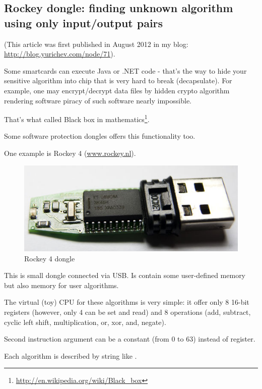 ﻿\subsection{Rockey dongle: finding unknown algorithm using only input/output pairs}

(This article was first published in August 2012 in my blog: \url{http://blog.yurichev.com/node/71}).

Some smartcards can execute Java or .NET code - that's the way to hide your sensitive algorithm into chip that is very hard to break (decapsulate).
For example, one may encrypt/decrypt data files by hidden crypto algorithm rendering software piracy of such software nearly impossible.

That's what called Black box in mathematics\footnote{\url{http://en.wikipedia.org/wiki/Black\_box}}.

Some software protection dongles offers this functionality too.

One example is Rockey 4 (\href{http://www.rockey.nl/en/rockey.html}{www.rockey.nl}).

\begin{figure}[H]
\centering
\includegraphics[scale=2]{SMT/rockey_4.jpg}
\caption{Rockey 4 dongle}
\end{figure}

This is small dongle connected via USB. Is contain some user-defined memory but also memory for user algorithms.

The virtual (toy) CPU for these algorithms is very simple: it offer only 8 16-bit registers (however, only 4 can be set and read) and 8 operations (add, subtract, cyclic left shift, multiplication, or, xor, and, negate).

Second instruction argument can be a constant (from 0 to 63) instead of register.

Each algorithm is described by string like \colorbox{light-gray}{}.

